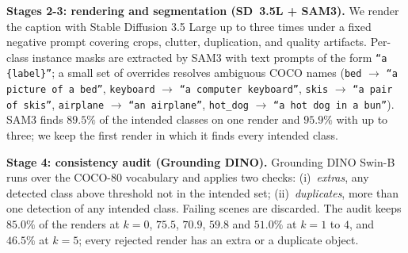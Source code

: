 \begin{table}[h!]
\centering\small
\caption{\textbf{Tier-conditioned scene descriptors.} $^\dagger$Defined in the released generator but not used for the benchmark scenes: its atypical sub-tiers $T_2$ to $T_6$ were captioned with the typical wording (construction note~(ii) below). Variant sub-tiers use the wording of their base sub-tier.}
\label{tab:tier_phrases}
\end{table}

\noindent\textbf{Stages 2-3: rendering and segmentation (SD~3.5L + SAM3).}
We render the caption with Stable Diffusion 3.5 Large up to three times under a fixed negative prompt covering crops, clutter, duplication, and quality artifacts. Per-class instance masks are extracted by SAM3 with text prompts of the form \texttt{``a \{label\}''}; a small set of overrides resolves ambiguous COCO names (\texttt{bed} $\to$ \texttt{``a picture of a bed''}, \texttt{keyboard} $\to$ \texttt{``a computer keyboard''}, \texttt{skis} $\to$ \texttt{``a pair of skis''}, \texttt{airplane} $\to$ \texttt{``an airplane''}, \texttt{hot\_dog} $\to$ \texttt{``a hot dog in a bun''}). SAM3 finds $89.5\%$ of the intended classes on one render and $95.9\%$ with up to three; we keep the first render in which it finds every intended class.

\noindent\textbf{Stage 4: consistency audit (Grounding DINO).}
Grounding DINO Swin-B runs over the COCO-$80$ vocabulary and applies two checks: (i)~\textit{extras}, any detected class above threshold not in the intended set;
(ii)~\textit{duplicates}, more than one detection of any intended class. Failing scenes are discarded.
The audit keeps $85.0\%$ of the renders at $k = 0$, $75.5$, $70.9$, $59.8$ and $51.0\%$ at $k = 1$ to $4$, and $46.5\%$ at $k = 5$; every rejected render has an extra or a duplicate object.


